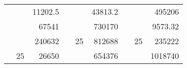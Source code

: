 \begin{table}[]
\begin{tabular}{|ccrccrccc}
\rowcolor[HTML]{DAE8FC} 
\multicolumn{1}{|c|}{\cellcolor[HTML]{FFFFC7}}                                & \multicolumn{1}{c|}{\cellcolor[HTML]{DAE8FC}}                      & \multicolumn{1}{r|}{\cellcolor[HTML]{DAE8FC}11202.5}   & \multicolumn{1}{c|}{\cellcolor[HTML]{FFFFC7}}                                & \multicolumn{1}{c|}{\cellcolor[HTML]{DAE8FC}}                       & \multicolumn{1}{r|}{\cellcolor[HTML]{DAE8FC}43813.2}   & \multicolumn{1}{c|}{\cellcolor[HTML]{FFFFC7}}                                & \multicolumn{1}{c|}{\cellcolor[HTML]{DAE8FC}}                      & \multicolumn{1}{r|}{\cellcolor[HTML]{DAE8FC}495206}    \\ \cline{3-3} \cline{6-6} \cline{9-9} 
\multicolumn{1}{|c|}{\cellcolor[HTML]{FFFFC7}}                                & \multicolumn{1}{c|}{\cellcolor[HTML]{DAE8FC}}                      & \multicolumn{1}{r|}{\cellcolor[HTML]{DDFDFF}67541}     & \multicolumn{1}{c|}{\cellcolor[HTML]{FFFFC7}}                                & \multicolumn{1}{c|}{\cellcolor[HTML]{DAE8FC}}                       & \multicolumn{1}{r|}{\cellcolor[HTML]{DDFDFF}730170}    & \multicolumn{1}{c|}{\cellcolor[HTML]{FFFFC7}}                                & \multicolumn{1}{c|}{\cellcolor[HTML]{DAE8FC}}                      & \multicolumn{1}{r|}{\cellcolor[HTML]{DDFDFF}9573.32}   \\ \cline{3-3} \cline{6-6} \cline{9-9} 
\rowcolor[HTML]{DAE8FC} 
\multicolumn{1}{|c|}{\cellcolor[HTML]{FFFFC7}}                                & \multicolumn{1}{c|}{\cellcolor[HTML]{DAE8FC}}                      & \multicolumn{1}{r|}{\cellcolor[HTML]{DAE8FC}240632}    & \multicolumn{1}{c|}{\cellcolor[HTML]{FFFFC7}}                                & \multicolumn{1}{c|}{\multirow{-9}{*}{\cellcolor[HTML]{DAE8FC}25}}   & \multicolumn{1}{r|}{\cellcolor[HTML]{DAE8FC}812688}    & \multicolumn{1}{c|}{\cellcolor[HTML]{FFFFC7}}                                & \multicolumn{1}{c|}{\multirow{-9}{*}{\cellcolor[HTML]{DAE8FC}25}}  & \multicolumn{1}{r|}{\cellcolor[HTML]{DAE8FC}235222}    \\ \cline{3-3} \cline{5-6} \cline{8-9} 
\multicolumn{1}{|c|}{\cellcolor[HTML]{FFFFC7}}                                & \multicolumn{1}{c|}{\multirow{-10}{*}{\cellcolor[HTML]{DAE8FC}25}} & \multicolumn{1}{r|}{\cellcolor[HTML]{DDFDFF}26650}     & \multicolumn{1}{c|}{\cellcolor[HTML]{FFFFC7}}                                & \multicolumn{1}{c|}{\cellcolor[HTML]{DDFDFF}}                       & \multicolumn{1}{r|}{\cellcolor[HTML]{DAE8FC}654376}    & \multicolumn{1}{c|}{\cellcolor[HTML]{FFFFC7}}                                & \multicolumn{1}{c|}{\cellcolor[HTML]{DDFDFF}}                      & \multicolumn{1}{r|}{\cellcolor[HTML]{DAE8FC}1018740}   \\ \cline{2-3} \cline{6-6} \cline{9-9} 

\end{tabular}
\end{table}
